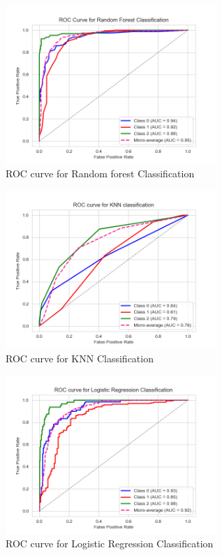 \documentclass[conference]{IEEEtran}
\begin{document}
\begin{figure}[H]
    \centering
    \includegraphics[width=8cm]{fig13.png}
    \caption{ROC curve for Random forest Classification}
    \label{fig:13}
\end{figure}

\begin{figure}[H]
    \centering
    \includegraphics[width=8cm]{fig14.png}
    \caption{ROC curve for KNN Classification}
    \label{fig:14}
\end{figure}

\begin{figure}[H]
    \centering
    \includegraphics[width=8cm]{fig15.png}
    \caption{ROC curve for Logistic Regression Classification}
    \label{fig:15}
\end{figure}
\end{document}

